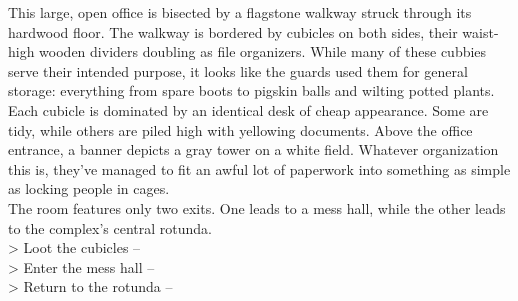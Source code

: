 This large, open office is bisected by a flagstone walkway struck through its hardwood floor. The walkway is bordered by cubicles on both sides, their waist-high wooden dividers doubling as file organizers. While many of these cubbies serve their intended purpose, it looks like the guards used them for general storage: everything from spare boots to pigskin balls and wilting potted plants.\\

Each cubicle is dominated by an identical desk of cheap appearance. Some are tidy, while others are piled high with yellowing documents. Above the office entrance, a banner depicts a gray tower on a white field. Whatever organization this is, they've managed to fit an awful lot of paperwork into something as simple as locking people in cages.\\

The room features only two exits. One leads to a mess hall, while the other leads to the complex's central rotunda.\\

> Loot the cubicles -- \\
> Enter the mess hall -- \\
> Return to the rotunda -- 